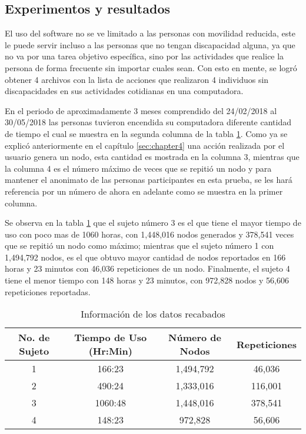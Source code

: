 \subsection{Experimentos y resultados}

El uso del software no se ve limitado a las personas con movilidad reducida,
 este le puede servir incluso a las personas que no tengan discapacidad 
 alguna, ya que no va por una tarea objetivo espec\'ifica, sino por las 
 actividades que realice la persona de forma frecuente sin importar cuales 
 sean. Con esto en mente, se logr\'o obtener 4 archivos con la lista de 
 acciones que realizaron 4 individuos sin discapacidades en sus actividades 
 cotidianas en una computadora.


En el periodo de aproximadamente 3 meses comprendido del 24/02/2018 al 
 30/05/2018 las personas tuvieron encendida su computadora diferente cantidad 
 de tiempo el cual se muestra en la segunda columna de la tabla 
 \ref{infodata}. Como ya se explic\'o anteriormente en el cap\'itulo 
 \ref{sec:chapter4} una acci\'on realizada por el usuario genera un nodo, esta 
 cantidad es mostrada en la columna 3, mientras que la columna 4 es el 
 n\'umero m\'aximo de veces que se repiti\'o un nodo y para mantener el 
 anonimato de las personas participantes en esta prueba, se les har\'a 
 referencia por un n\'umero de ahora en adelante como se muestra en la primer 
 columna. 

Se observa en la tabla \ref{infodata} que el sujeto n\'umero 3 es el que tiene 
 el mayor tiempo de uso con poco mas de 1060 horas, con 1,448,016 nodos 
 generados y 378,541 veces que se repiti\'o un nodo como m\'aximo; mientras 
 que el sujeto n\'umero 1 con 1,494,792 nodos, es el que obtuvo mayor cantidad 
 de nodos reportados en 166 horas y 23 minutos con 46,036 repeticiones de un 
 nodo. Finalmente, el sujeto 4 tiene el menor tiempo con 148 horas y 23 
 minutos, con 972,828 nodos y 56,606 repeticiones reportadas.


\begin{table}[]
\centering
\begin{tabular}{cccc}
\hline
No. de Sujeto	
&   Tiempo de Uso (Hr:Min)		
&	N\'umero de Nodos	
&   Repeticiones 	\\   
\hline

1				
&	166:23 						
&	1,494,792			
&	46,036				\\
		
2
&	490:24
&	1,333,016
&	116,001				\\
		
3
&	1060:48
&	1,448,016
&	378,541				\\
		
4
&	148:23
&	972,828
&	56,606				\\ 
\hline

\end{tabular}
\caption{Informaci\'on de los datos recabados}
\label{infodata}
\end{table}

